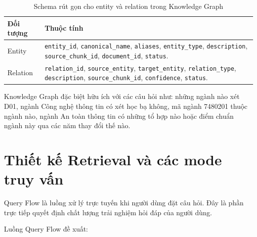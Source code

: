 \documentclass[12pt,a4paper]{report}
\begin{document}
\begin{table}[H]
\centering
\begin{tabular}{|p{3.8cm}|p{9cm}|}
\hline
\textbf{Đối tượng} & \textbf{Thuộc tính} \\
\hline
Entity & \texttt{entity\_id}, \texttt{canonical\_name}, \texttt{aliases}, \texttt{entity\_type}, \texttt{description}, \texttt{source\_chunk\_id}, \texttt{document\_id}, \texttt{status}. \\
\hline
Relation & \texttt{relation\_id}, \texttt{source\_entity}, \texttt{target\_entity}, \texttt{relation\_type}, \texttt{description}, \texttt{source\_chunk\_id}, \texttt{confidence}, \texttt{status}. \\
\hline
\end{tabular}
\caption{Schema rút gọn cho entity và relation trong Knowledge Graph}
\label{tab:rag-kg-schema}
\end{table}

Knowledge Graph đặc biệt hữu ích với các câu hỏi như: những ngành nào xét D01, ngành Công nghệ thông tin có xét học bạ không, mã ngành 7480201 thuộc ngành nào, ngành An toàn thông tin có những tổ hợp nào hoặc điểm chuẩn ngành này qua các năm thay đổi thế nào.

\section{Thiết kế Retrieval và các mode truy vấn}

Query Flow là luồng xử lý trực tuyến khi người dùng đặt câu hỏi. Đây là phần trực tiếp quyết định chất lượng trải nghiệm hỏi đáp của người dùng.

Luồng Query Flow đề xuất:
\end{document}
